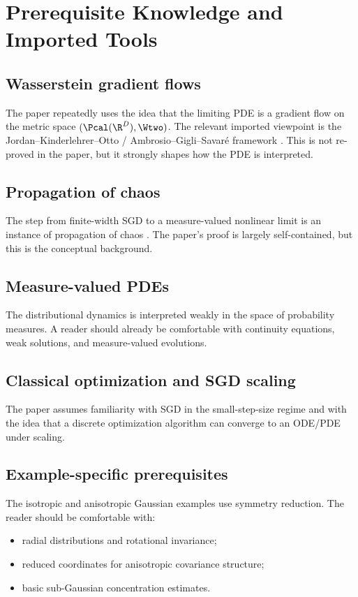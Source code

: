 \section{Prerequisite Knowledge and Imported Tools}

\subsection*{Wasserstein gradient flows}
The paper repeatedly uses the idea that the limiting PDE is a gradient flow on the metric space $(\Pcal(\R^D), \Wtwo)$. The relevant imported viewpoint is the Jordan--Kinderlehrer--Otto / Ambrosio--Gigli--Savar\'e framework \cite{jordan1998variational,ambrosio2008gradient}. This is not re-proved in the paper, but it strongly shapes how the PDE is interpreted.

\subsection*{Propagation of chaos}
The step from finite-width SGD to a measure-valued nonlinear limit is an instance of propagation of chaos \cite{sznitman1991topics}. The paper's proof is largely self-contained, but this is the conceptual background.

\subsection*{Measure-valued PDEs}
The distributional dynamics is interpreted weakly in the space of probability measures. A reader should already be comfortable with continuity equations, weak solutions, and measure-valued evolutions.

\subsection*{Classical optimization and SGD scaling}
The paper assumes familiarity with SGD in the small-step-size regime and with the idea that a discrete optimization algorithm can converge to an ODE/PDE under scaling.

\subsection*{Example-specific prerequisites}
The isotropic and anisotropic Gaussian examples use symmetry reduction. The reader should be comfortable with:
\begin{itemize}[leftmargin=1.5em]
\item radial distributions and rotational invariance;
\item reduced coordinates for anisotropic covariance structure;
\item basic sub-Gaussian concentration estimates.
\end{itemize}
